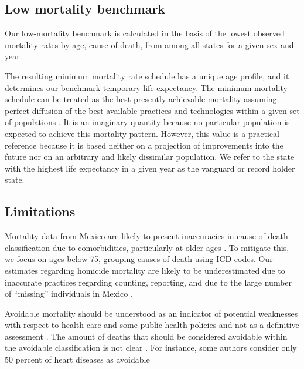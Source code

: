 \documentclass[11.5pt]{article}
\begin{document}
\begin{spacing}{1.5}
\subsection*{Low mortality benchmark}
Our low-mortality benchmark is calculated in the basis of the lowest observed mortality rates by age, cause of death, from among all states for a given sex and year.



The resulting minimum mortality rate schedule has a unique age profile, and it determines our benchmark temporary life expectancy. The minimum mortality schedule can be treated as the best presently achievable mortality assuming perfect diffusion of the best available practices and technologies within a given set of populations \citep{vallin2008minimum}. It is an imaginary quantity because no particular population is expected to achieve this mortality pattern. However, this value is a practical reference because it is based neither on a projection of improvements into the future nor on an arbitrary and likely dissimilar population. We refer to the state with the highest life expectancy in a given year as the vanguard or record holder state.


\subsection*{Limitations}
Mortality data from Mexico are
likely to present inaccuracies in cause-of-death classification due to
comorbidities, particularly at older ages \citep{tobias2001}. To mitigate this,
we focus on ages below 75, grouping causes of death using ICD codes.
Our estimates regarding homicide mortality are likely to be
underestimated due to inaccurate practices regarding counting, reporting,
and due to the large number of ``missing'' individuals in Mexico \citep{HRW2011}.

Avoidable mortality should be understood as an indicator of potential
weaknesses with respect to health care and some public health policies and not
as a definitive assessment \citep{nolte&mckee2008}. The amount of deaths that should be considered avoidable within the avoidable classification is not clear \citep{beltran2011avoidable}. For instance, some authors consider only 50 percent of heart diseases as avoidable \citep{nolte2012amenable}


\end{spacing}
\end{document}
